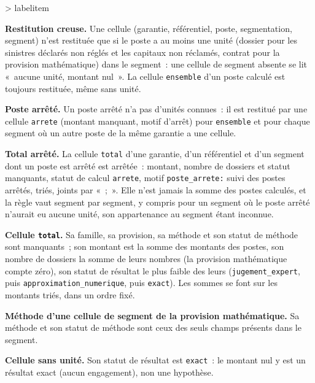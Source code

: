 \documentclass[a4paper,11pt]{article}
\makeatletter
\let\charte@listORI\list
\def\charte@listV{%
  \setlength{\topsep}{0.8ex plus 0.4ex minus 0.4ex}%
  \setlength{\partopsep}{0.4ex plus 0.2ex minus 0.2ex}%
  \charte@parskip=\parskip
  \addtolength{\topsep}{-\charte@parskip}%
  \addtolength{\partopsep}{\charte@parskip}%
  \setlength{\itemsep}{0.4ex plus 0.2ex minus 0.2ex}%
  \setlength{\parsep}{0.4ex plus 0.2ex minus 0.2ex}%
  \ifdim\charte@parskip>\z@
    \setlength{\parsep}{\charte@parskip}%
    \addtolength{\itemsep}{-\charte@parskip}%
  \fi}
\def\list#1#2{\charte@listORI{#1}{\charte@listV #2}}
\renewenvironment{itemize}[1][]{%
  \ifnum\@itemdepth>\thr@@\@toodeep\else
    \advance\@itemdepth\@ne
    \edef\@itemitem{labelitem\romannumeral\the\@itemdepth}%
    \expandafter\list\csname\@itemitem\endcsname
      {\def\makelabel##1{\hss\llap{##1}}\setkeys{charteliste}{#1}}%
  \fi}{\endlist}
\newcommand{\code}[1]{\texttt{\small #1}}
\makeatother
\begin{document}
\begin{itemize}[itemsep=2pt]
\item \textbf{Restitution creuse.} Une cellule (garantie, référentiel,
  poste, segmentation, segment) n'est restituée que si le poste a au moins
  une unité (dossier pour les sinistres déclarés non réglés et les capitaux
  non réclamés, contrat pour la provision mathématique) dans le segment~:
  une cellule de segment absente se lit «~aucune unité, montant nul~». La
  cellule \code{ensemble} d'un poste calculé est toujours restituée, même
  sans unité.
\item \textbf{Poste arrêté.} Un poste arrêté n'a pas d'unités connues~: il
  est restitué par une cellule \code{arrete} (montant manquant, motif
  d'arrêt) pour \code{ensemble} et pour chaque segment où un autre poste de
  la même garantie a une cellule.
\item \textbf{Total arrêté.} La cellule \code{total} d'une garantie, d'un
  référentiel et d'un segment dont un poste est arrêté est arrêtée~:
  montant, nombre de dossiers et statut manquants, statut de calcul
  \code{arrete}, motif \code{poste\_arrete:} suivi des postes arrêtés,
  triés, joints par «~;~». Elle n'est jamais la somme des postes calculés,
  et la règle vaut segment par segment, y compris pour un segment où le
  poste arrêté n'aurait eu aucune unité, son appartenance au segment étant
  inconnue.
\item \textbf{Cellule \code{total}.} Sa famille, sa provision, sa méthode et
  son statut de méthode sont manquants~; son montant est la somme des
  montants des postes, son nombre de dossiers la somme de leurs nombres (la
  provision mathématique compte zéro), son statut de résultat le plus
  faible des leurs (\code{jugement\_expert}, puis
  \code{approximation\_numerique}, puis \code{exact}). Les sommes se font
  sur les montants triés, dans un ordre fixé.
\item \textbf{Méthode d'une cellule de segment de la provision
  mathématique.} Sa méthode et son statut de méthode sont ceux des seuls
  champs présents dans le segment.
\item \textbf{Cellule sans unité.} Son statut de résultat est \code{exact}~:
  le montant nul y est un résultat exact (aucun engagement), non une
  hypothèse.
\end{itemize}
\end{document}
